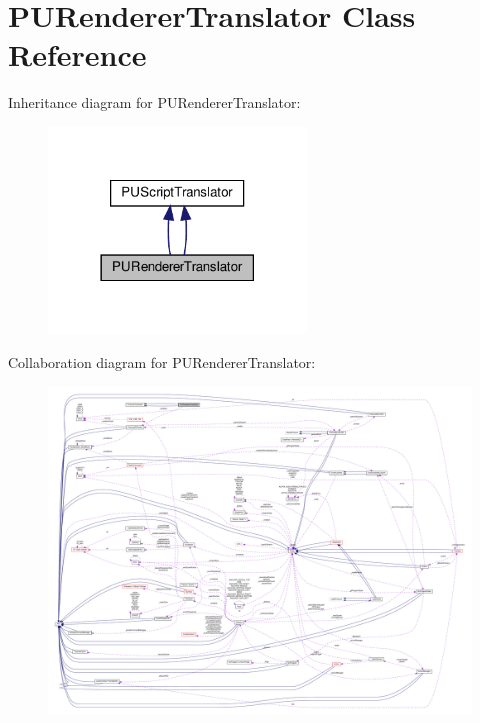 \hypertarget{classPURendererTranslator}{}\section{P\+U\+Renderer\+Translator Class Reference}
\label{classPURendererTranslator}


Inheritance diagram for P\+U\+Renderer\+Translator\+:
\nopagebreak
\begin{figure}[H]
\begin{center}
\leavevmode
\includegraphics[width=194pt]{classPURendererTranslator__inherit__graph}
\end{center}
\end{figure}


Collaboration diagram for P\+U\+Renderer\+Translator\+:
\nopagebreak
\begin{figure}[H]
\begin{center}
\leavevmode
\includegraphics[width=350pt]{classPURendererTranslator__coll__graph}
\end{center}
\end{figure}
